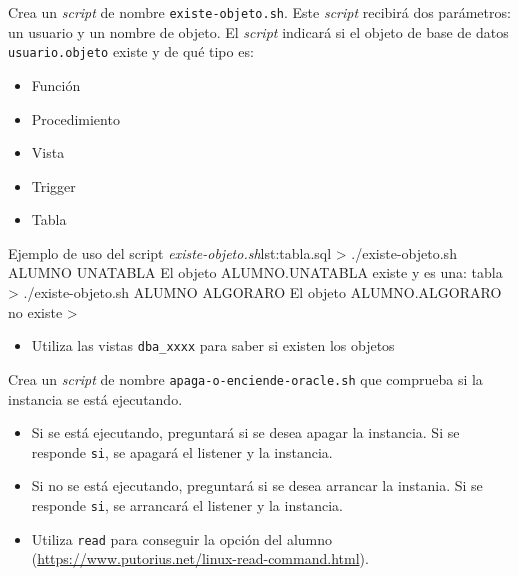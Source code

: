 \begin{homeworkProblem}
  Crea un \textit{script} de nombre \texttt{existe-objeto.sh}. Este \textit{script} recibirá dos parámetros: un usuario y un nombre de objeto. El \textit{script} indicará si el objeto de base de datos \texttt{usuario.objeto} existe y de qué tipo es:
  \begin{itemize}
  \item Función
  \item Procedimiento
  \item Vista
  \item Trigger
  \item Tabla
  \end{itemize}
  
  \begin{listadoshell}{Ejemplo de uso del script \textit{existe-objeto.sh}}{lst:tabla.sql}
    > ./existe-objeto.sh ALUMNO UNATABLA
    El objeto ALUMNO.UNATABLA existe y es una: tabla
    > ./existe-objeto.sh ALUMNO ALGORARO
    El objeto ALUMNO.ALGORARO no existe
    >
  \end{listadoshell}
  
  \begin{Aviso}[Ayuda]
    \begin{itemize}
    \item Utiliza las vistas \texttt{dba\_xxxx} para saber si existen los objetos
    \end{itemize}
  \end{Aviso}
  
\end{homeworkProblem}

\begin{homeworkProblem}
  Crea un \textit{script} de nombre \texttt{apaga-o-enciende-oracle.sh} que comprueba si la instancia se está ejecutando.
  \begin{itemize}
  \item Si se está ejecutando, preguntará si se desea apagar la instancia. Si se responde \texttt{si}, se apagará el listener y la instancia.
  \item Si no se está ejecutando, preguntará si se desea arrancar la instania. Si se responde \texttt{si}, se arrancará el listener y la instancia.
  \end{itemize}

  \begin{Aviso}[Ayuda]
    \begin{itemize}
    \item Utiliza \texttt{read} para conseguir la opción del alumno (\url{https://www.putorius.net/linux-read-command.html}).
    \end{itemize}
  \end{Aviso}
\end{homeworkProblem}

